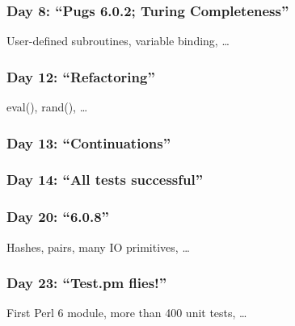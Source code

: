 \documentclass[12pt,compress,english,utf8,t]{beamer}
\newcommand{\inputminted}[2]{}
\begin{document}
\begin{frame}[label=turing-completeness]\frametitle{Day 8: ``Pugs 6.0.2; Turing Completeness''}
  User-defined subroutines, variable binding, \ldots\par
  \inputminted{haskell}{code-snippets/day8-eval.hs}
\end{frame}


\begin{frame}[label=refactoring]\frametitle{Day 12: ``Refactoring''}
  eval(), rand(), \ldots\par
  \inputminted{haskell}{code-snippets/day12-prim.hs}
\end{frame}

\begin{frame}[label=continuations]\frametitle{Day 13: ``Continuations''}
  \inputminted{haskell}{code-snippets/day13-monads.hs}
  \bigskip
  \inputminted{haskell}{code-snippets/day13-ast.hs}
\end{frame}

\begin{frame}[label=all-tests-successful]\frametitle{Day 14: ``All tests successful''}
  \inputminted{perl}{code-snippets/day14-basic.pl}
\end{frame}

\begin{frame}[label=608]\frametitle{Day 20: ``6.0.8''}
  Hashes, pairs, many IO primitives, \ldots\par
  \inputminted{perl}{code-snippets/day20-ycombinator.pl}
\end{frame}

\begin{frame}[label=testpm]\frametitle{Day 23: ``Test.pm flies!''}
  First Perl 6 module, more than 400 unit tests, \ldots\par
  \inputminted{perl}{code-snippets/day23-test.pm}
\end{frame}
\end{document}
